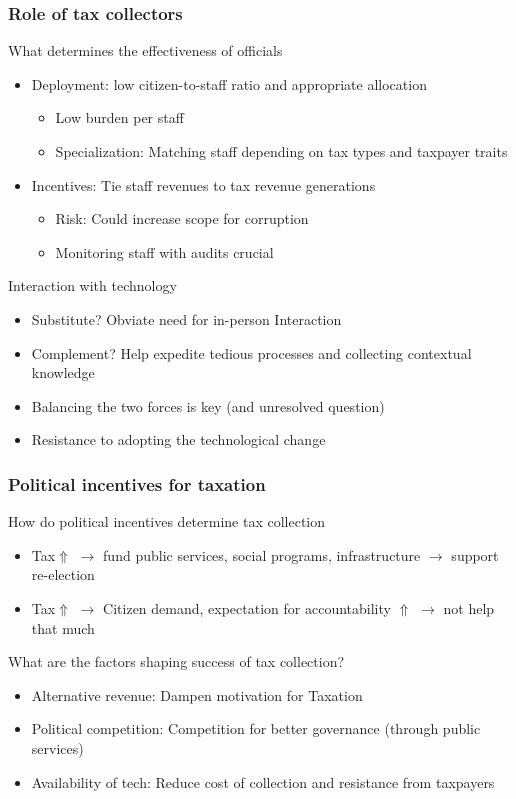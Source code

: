 \documentclass[aspectratio=169]{beamer}
\begin{document}
\begin{frame}
\frametitle{Role of tax collectors} 
What determines the effectiveness of officials
\begin{itemize}\setlength\itemsep{3pt}
\item Deployment: low citizen-to-staff ratio and appropriate allocation
\begin{itemize}\setlength\itemsep{3pt}
\item Low burden per staff
\item Specialization: Matching staff depending on tax types and taxpayer traits 
\end{itemize}
\item Incentives: Tie staff revenues to tax revenue generations
 \begin{itemize}\setlength\itemsep{3pt}
\item Risk: Could increase scope for corruption
\item Monitoring staff with audits crucial 
\end{itemize}
\end{itemize}\medskip
Interaction with technology
\begin{itemize}\setlength\itemsep{3pt}
\item Substitute? Obviate need for in-person Interaction
\item Complement? Help expedite tedious processes and collecting contextual knowledge
\item Balancing the two forces is key (and unresolved question)
\item Resistance to adopting the technological change
\end{itemize}\medskip
\end{frame}


\begin{frame}
\frametitle{Political incentives for taxation} 
How do political incentives determine tax collection
\begin{itemize}\setlength\itemsep{3pt}
\item Tax$\Uparrow$ $\to$ fund public services, social programs, infrastructure $\to$ support re-election
\item Tax$\Uparrow$ $\to$ Citizen demand, expectation for accountability $\Uparrow$ $\to$ not help that much
\end{itemize} \medskip
What are the factors shaping success of tax collection?
\begin{itemize}
\item Alternative revenue: Dampen motivation for Taxation
\item Political competition: Competition for better governance (through public services)
\item Availability of tech: Reduce cost of collection and resistance from taxpayers
\end{itemize}
\end{frame}
\end{document}

